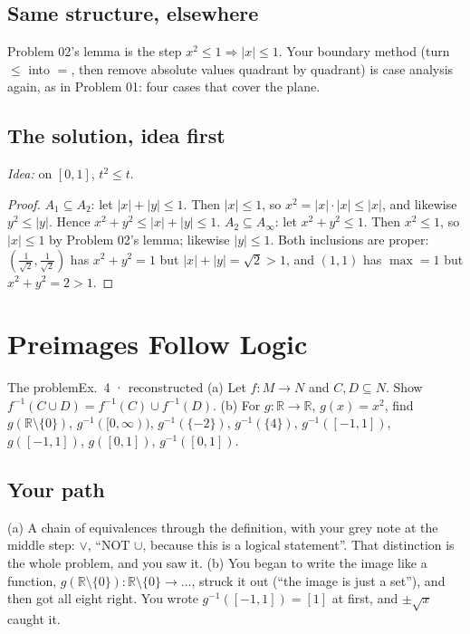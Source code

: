 \documentclass{kaelearn}
\begin{document}
\subsection{Same structure, elsewhere}
Problem 02's lemma is the step $x^2\le1\Rightarrow|x|\le1$. Your boundary method (turn $\le$ into $=$, then remove
absolute values quadrant by quadrant) is case analysis again, as in Problem 01: four cases that cover the plane.



\subsection{The solution, idea first}
\emph{Idea:} on $[0,1]$, $t^2\le t$.
\begin{proof}
$A_1\subseteq A_2$: let $|x|+|y|\le1$. Then $|x|\le1$, so $x^2=|x|\cdot|x|\le|x|$, and likewise $y^2\le|y|$. Hence
$x^2+y^2\le|x|+|y|\le1$.
$A_2\subseteq A_\infty$: let $x^2+y^2\le1$. Then $x^2\le1$, so $|x|\le1$ by Problem 02's lemma; likewise $|y|\le1$.
Both inclusions are proper: $(\frac{1}{\sqrt2},\frac{1}{\sqrt2})$ has $x^2+y^2=1$ but $|x|+|y|=\sqrt2>1$, and $(1,1)$
has $\max=1$ but $x^2+y^2=2>1$.
\end{proof}

\section{Preimages Follow Logic}

\begin{panel}[unbreakable]{The problem}{Ex.\ 4 · reconstructed}{}
(a) Let $f:M\to N$ and $C,D\subseteq N$. Show $f^{-1}(C\cup D)=f^{-1}(C)\cup f^{-1}(D)$.
(b) For $g:\mathbb{R}\to\mathbb{R}$, $g(x)=x^2$, find $g(\mathbb{R}\setminus\{0\})$, $g^{-1}([0,\infty))$,
$g^{-1}(\{-2\})$, $g^{-1}(\{4\})$, $g^{-1}([-1,1])$, $g([-1,1])$, $g([0,1])$, $g^{-1}([0,1])$.
\end{panel}

\subsection{Your path}
(a) A chain of equivalences through the definition, with your grey note at the middle step: $\vee$, ``NOT $\cup$,
because this is a logical statement''. That distinction is the whole problem, and you saw it. (b) You began to
write the image like a function, $g(\mathbb{R}\setminus\{0\}):\mathbb{R}\setminus\{0\}\to\dots$, struck it out
(``the image is just a set''), and then got all eight right. You wrote $g^{-1}([-1,1])=[1]$ at first, and
$\pm\sqrt{x}$ caught it.
\end{document}
